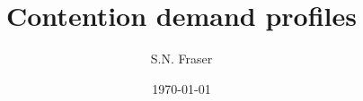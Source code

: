 \documentclass[12pt,a4paper]{article}
\begin{document}
\setlength{\parindent}{5mm}
\setlength{\parskip}{10pt plus2mm minus2mm}
\thispagestyle{empty}

\title{Contention demand profiles}
\author{S.N. Fraser}
\date{\today}
\maketitle


\end{document}

